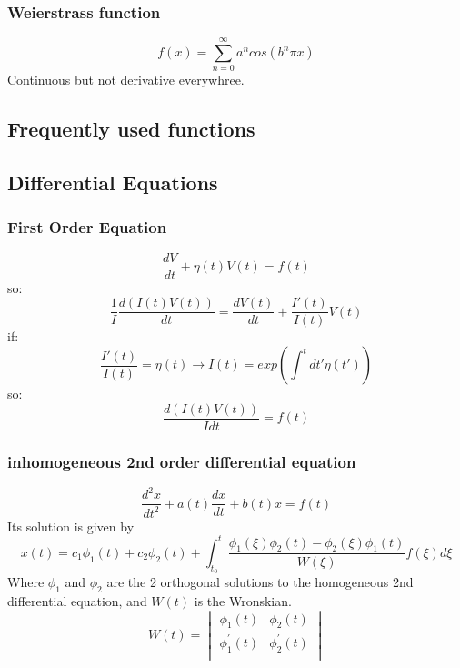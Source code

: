 \subsubsection{Weierstrass function}
\begin{equation}
    f(x) = \sum_{n=0}^{\infty}a^{n}cos(b^{n}\pi x)
\end{equation}
Continuous but not derivative everywhree.


\subsection{Frequently used functions}

\subsection{Differential Equations}

\subsubsection{First Order Equation}
\[ 
\frac{dV}{dt} + \eta(t)V(t) = f(t)  
\]
so:
\[
    \frac{1}{I}\frac{d(I(t)V(t))}{dt} = \frac{dV(t)}{dt} + \frac{I'(t)}{I(t)}V(t)
    \]
if: 
\[ 
    \frac{I'(t)}{I(t)} = \eta(t)	\rightarrow I(t) = exp(\int^{t}dt'\eta(t'))
    \]
so:
\[ \frac{d(I(t)V(t))}{I dt} = f(t)\]

\subsubsection{inhomogeneous 2nd order differential equation}
\begin{equation}
    \frac{d^{2}x}{dt^2} + a(t)\frac{dx}{dt} + b(t)x = f(t)
\end{equation}
Its solution is given by
\begin{equation}
    \displaystyle x(t) = c_{1}\phi_{1}(t) + c_{2}\phi_{2}(t) + \int_{t_0}^{t}\frac{\phi_{1}(\xi)\phi_{2}(t) - \phi_{2}(\xi)\phi_{1}(t)}{W(\xi)} f(\xi)d\xi
\end{equation}
Where $\phi_{1}$ and $\phi_{2}$ are the 2 orthogonal solutions to the homogeneous 2nd differential equation, and $W(t)$ is the Wronskian.
\begin{equation}
    W(t) = 
	\begin{vmatrix}
	    \phi_1(t)	    & \phi_2(t) \\
	    \phi_1^{'}(t)   & \phi_2^{'}(t)	\\
	\end{vmatrix}
\end{equation}


